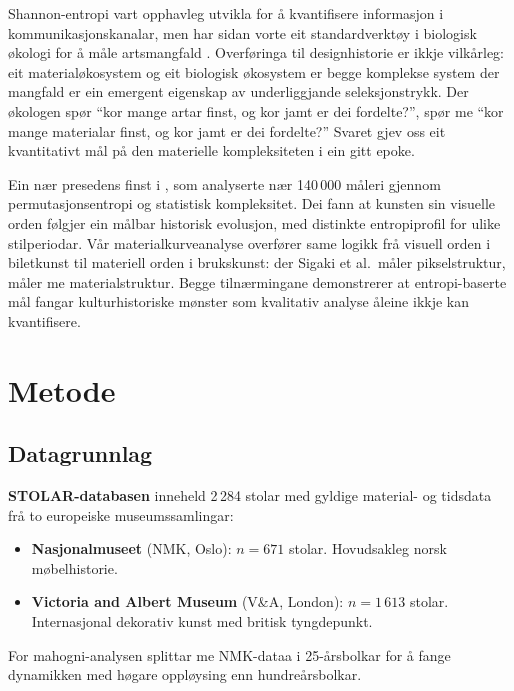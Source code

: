 \documentclass[10pt, a4paper, twocolumn]{article}
\begin{document}
Shannon-entropi \citep{shannon1948} vart opphavleg utvikla for å kvantifisere informasjon i kommunikasjonskanalar, men har sidan vorte eit standardverktøy i biologisk økologi for å måle artsmangfald \citep{magurran2004}. Overføringa til designhistorie er ikkje vilkårleg: eit materialøkosystem og eit biologisk økosystem er begge komplekse system der mangfald er ein emergent eigenskap av underliggjande seleksjonstrykk. Der økologen spør ``kor mange artar finst, og kor jamt er dei fordelte?'', spør me ``kor mange materialar finst, og kor jamt er dei fordelte?'' Svaret gjev oss eit kvantitativt mål på den materielle kompleksiteten i ein gitt epoke.

Ein nær presedens finst i \citet{sigaki_history_2018}, som analyserte nær 140\,000 måleri gjennom permutasjonsentropi og statistisk kompleksitet. Dei fann at kunsten sin visuelle orden følgjer ein målbar historisk evolusjon, med distinkte entropiprofil for ulike stilperiodar. Vår materialkurveanalyse overfører same logikk frå visuell orden i biletkunst til materiell orden i brukskunst: der Sigaki et al.\ måler pikselstruktur, måler me materialstruktur. Begge tilnærmingane demonstrerer at entropi-baserte mål fangar kulturhistoriske mønster som kvalitativ analyse åleine ikkje kan kvantifisere.


\section{Metode}

\subsection{Datagrunnlag}

\textbf{STOLAR-databasen} \citep{finne2026} inneheld 2\,284 stolar med gyldige material- og tidsdata frå to europeiske museumssamlingar:

\begin{itemize}
  \item \textbf{Nasjonalmuseet} (NMK, Oslo): $n = 671$ stolar. Hovudsakleg norsk møbelhistorie.
  \item \textbf{Victoria and Albert Museum} (V\&A, London): $n = 1\,613$ stolar. Internasjonal dekorativ kunst med britisk tyngdepunkt.
\end{itemize}

For mahogni-analysen splittar me NMK-dataa i 25-årsbolkar for å fange dynamikken med høgare oppløysing enn hundreårsbolkar.
\end{document}

